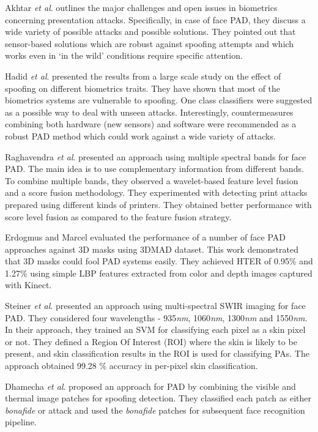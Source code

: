 \documentclass[journal]{IEEEtran}
\begin{document}
Akhtar \textit{et al}. \cite{akhtar2015biometric} outlines the major challenges and open issues in biometrics concerning presentation attacks. Specifically, in case of face PAD, they discuss a wide variety of possible attacks and possible solutions. They pointed out that sensor-based solutions which are robust against spoofing attempts and which works even in `in the wild' conditions require specific attention. 

Hadid \textit{et al}. \cite{hadid2015biometrics} presented the results from a large scale study on the effect of spoofing on different biometrics traits. They have shown that most of the biometrics systems are vulnerable to spoofing. One class classifiers were suggested as a possible way to deal with unseen attacks. Interestingly, countermeasures combining both hardware (new sensors) and software were recommended as a robust PAD method which could work against a wide variety of attacks. 


Raghavendra \textit{et al}. \cite{raghavendra2017extended} presented an approach using multiple spectral bands for face PAD. The main idea is to use complementary information from different bands. To combine multiple bands, they observed a wavelet-based feature level fusion and a score fusion methodology. They experimented with detecting print attacks prepared using different kinds of printers. They obtained better performance with score level fusion as compared to the feature fusion strategy. 

Erdogmus and Marcel \cite{erdogmus2014spoofing} evaluated the performance of a number of face PAD approaches against 3D masks using 3DMAD dataset. This work demonstrated that 3D masks could fool PAD systems easily. They achieved HTER of 0.95\% and 1.27\% using simple LBP features extracted from color and depth images captured with Kinect.

Steiner \textit{et al}. \cite{steiner2016reliable} presented an approach using multi-spectral SWIR imaging for face PAD.  They considered four wavelengths - 935\textit{nm}, 1060\textit{nm}, 1300\textit{nm} and 1550\textit{nm}. In their approach, they trained an SVM for classifying each pixel as a skin pixel or not. They defined a Region Of Interest (ROI) where the skin is likely to be present, and skin classification results in the ROI is used for classifying PAs. The approach obtained 99.28 \% accuracy in per-pixel skin classification.

Dhamecha \textit{et al}. \cite{dhamecha2013disguise} proposed an approach for PAD by combining the visible and thermal image patches for spoofing detection.
They classified each patch as either \textit{bonafide} or attack and used the \textit{bonafide} patches for subsequent face recognition pipeline.
\end{document}
